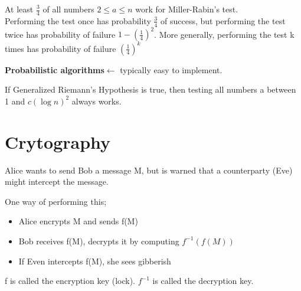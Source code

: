 \documentclass[9pt, letterpaper, oneside]{article}
\begin{document}
At least $\frac{3}{4}$ of all numbers $2 \leq a \leq n$ work for Miller-Rabin's test.\\
Performing the test once has probability $ \displaystyle \frac{3}{4}$ of success, but performing the test twice has probability of failure $\displaystyle 1 - (\frac{1}{4})^2$. More generally, performing the test k times has probability of failure $\displaystyle (\frac{1}{4})^k$

\textbf{Probabilistic algorithms}$\leftarrow$ typically easy to implement.

If Generalized Riemann's Hypothesis is true, then testing all numbers a between 1 and $c(\log n)^2$ always works.

\section{Crytography}

Alice wants to send Bob a message M, but is warned that a counterparty (Eve) might intercept the message.

One way of performing this;
\begin{itemize}
    \item Alice encrypts M and sends f(M)
    \item Bob receives f(M), decrypts it by computing $f^{-1}(f(M))$
    \item If Even intercepts f(M), she sees gibberish
\end{itemize}

f is called the encryption key (lock).
$f^{-1}$ is called the decryption key.
\end{document}
